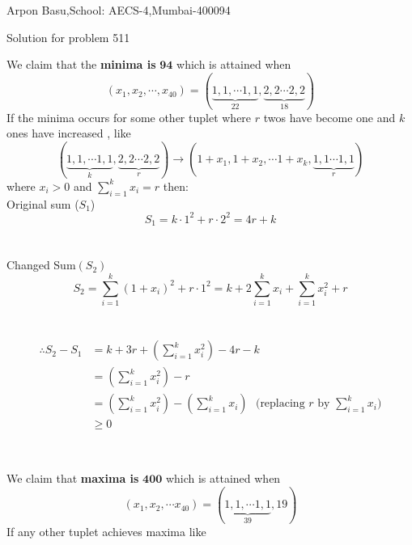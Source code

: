 \documentclass[a4paper,10pt]{article}
\begin{document}
\begin{center}


Arpon Basu,School: AECS-4,Mumbai-400094

Solution for problem 511
\end{center}

   We claim that the \textbf{minima is} $\mathbf{94}$ which is attained when $$(x_{1},x_{2}, \cdots ,x_{40})=(\underbrace{1,1, \cdots 1,1}_{22},\underbrace{2,2 \cdots 2,2}_{18})$$
   If the minima occurs for some other tuplet where $r$ twos have become one and $k$ ones have increased , like 
   $$ (\underbrace{1,1, \cdots 1,1}_{k},\underbrace{2,2 \cdots 2,2}_{r}) \longrightarrow (1+x_{1},1+x_{2}, \cdots 1+x_{k},\underbrace{1,1 \cdots 1,1}_{r})$$ 
   where $x_{i}>0$ and $\sum_{i=1}^{k} x_{i} = r $ then: \\
  
   Original sum ($S_{1} $) $$S_{1} = k\cdot 1^2 + r\cdot 2^2 = 4r+k$$ \\
   \\
   Changed Sum$(S_{2})$   $$ S_{2}=\sum_{i=1}^{k} (1+x_{i})^2 + r\cdot 1^2=k+2 \sum_{i=1}^{k} x_{i} +\sum_{i=1}^{k} x_{i}^2 + r $$\\
   \\
   
   
 
   

\begin{equation}
\begin{split}
\therefore S_{2}-S_{1} & =k+3r+ (\sum_{i=1}^{k} x_{i}^2) -4r - k \\
& = (\sum_{i=1}^{k} x_{i}^2) -r \\
& =(\sum_{i=1}^{k} x_{i}^2) - (\sum_{i=1}^{k} x_{i}) \hspace{8pt}\text{(replacing $r$ by $\sum_{i=1}^{k} x_{i}$)}\\
& \ge 0
\end{split}
\end{equation}




   
   
   
   \begin{center}
      \\
    \end{center}
   
   We claim that \textbf{maxima is} $\mathbf{400}$ which is attained when $$(x_{1},x_{2}, \cdots x_{40})=(\underbrace{1,1, \cdots 1,1}_{39},19)$$ 
   If any other tuplet achieves maxima like
   
\end{document}
